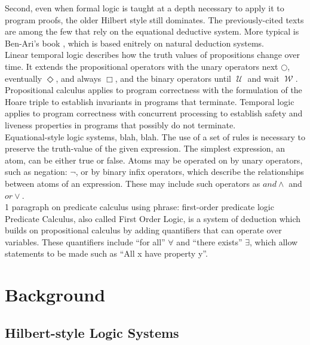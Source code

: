 \documentclass[fleqn, leqno]{article}
\newcommand{\until}{\;\mathcal{U}\;}
\newcommand{\wait}{\;\mathcal{W}\;}
\newcommand{\next}{\bigcirc}
\newcommand{\event}{\Diamond}
\newcommand{\always}{\Box}
\begin{document}
Second, even when formal logic is taught at a depth necessary to apply it to program proofs, the older Hilbert style
still dominates.
The previously-cited texts \cite{Cohen, LADM, Kald} are among the few that rely on the equational deductive system. 
More typical is Ben-Ari's book \cite{Ben}, which is based enitrely on natural deduction systems.\\

Linear temporal logic describes how the truth values of propositions change over time.
It extends the propositional operators with the unary operators next $\next$, eventually $\event$, and always $\always$,
and the binary operators until $\until$ and wait $\wait$.
Propositional calculus applies to program correctness with the formulation of the Hoare triple to establish invariants
in programs that terminate.
Temporal logic applies to program correctness with concurrent processing to establish safety and liveness properties
in programs that possibly do not terminate.\\



Equational-style logic systems, blah, blah.
The use of a set of rules is necessary to preserve the truth-value of the given expression.
The simplest expression, an atom, can be either true or false. 
Atoms may be operated on by unary operators, such as negation: $\lnot$, or by binary infix operators, which describe the relationships between atoms of an expression.
These may include such operators as $and \land$ and $or \lor$.\\

1 paragraph on predicate calculus using phrase: first-order predicate logic\\

Predicate Calculus, also called First Order Logic, is a system of deduction which builds on propositional calculus by adding quantifiers that can operate over variables.  These quantifiers include ``for all'' $\forall$ and ``there exists'' $\exists$, which allow statements to be made such as ``All x have property y''.\\

\section{Background}

\subsection{Hilbert-style Logic Systems}
\end{document}
